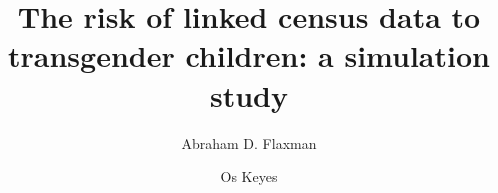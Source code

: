 \documentclass{jpc} %
\theoremstyle{plain}\newtheorem{satz}[thm]{Satz} %
\def\eg{{\em e.g.}}
\begin{document}
\title[Risk of linked census data to transgender families]{The risk of linked census data to transgender children: a simulation study}

\author[A.~Flaxman]{Abraham D. Flaxman}	%
\address{Institute for Health Metrics and Evaluation, University of Washington}	%

\author[O. Keyes]{Os Keyes}





\end{document}
